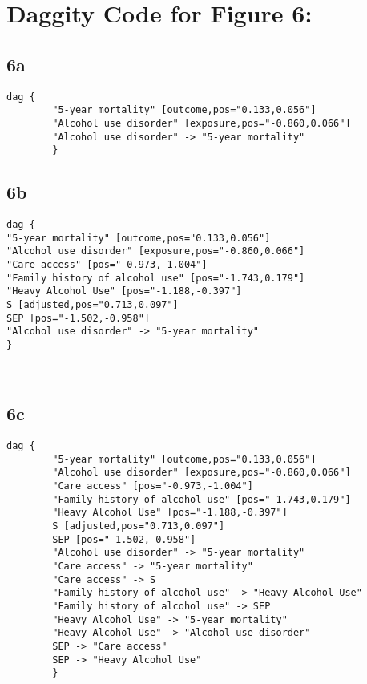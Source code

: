 \documentclass{article}
\begin{document}
\section*{Daggity Code for Figure 6:}
\subsection*{6a}
\begin{lstlisting}[frame=single, basicstyle=\ttfamily, linewidth=20.5cm]
    dag {
        "5-year mortality" [outcome,pos="0.133,0.056"]
        "Alcohol use disorder" [exposure,pos="-0.860,0.066"]
        "Alcohol use disorder" -> "5-year mortality"
        }        
\end{lstlisting}

\subsection*{6b}
\begin{lstlisting}[frame=single, basicstyle=\ttfamily, linewidth=20.5cm]
    dag {
"5-year mortality" [outcome,pos="0.133,0.056"]
"Alcohol use disorder" [exposure,pos="-0.860,0.066"]
"Care access" [pos="-0.973,-1.004"]
"Family history of alcohol use" [pos="-1.743,0.179"]
"Heavy Alcohol Use" [pos="-1.188,-0.397"]
S [adjusted,pos="0.713,0.097"]
SEP [pos="-1.502,-0.958"]
"Alcohol use disorder" -> "5-year mortality"
}

        
\end{lstlisting}

\subsection*{6c}
\begin{lstlisting}[frame=single, basicstyle=\ttfamily, linewidth=20.5cm]
    dag {
        "5-year mortality" [outcome,pos="0.133,0.056"]
        "Alcohol use disorder" [exposure,pos="-0.860,0.066"]
        "Care access" [pos="-0.973,-1.004"]
        "Family history of alcohol use" [pos="-1.743,0.179"]
        "Heavy Alcohol Use" [pos="-1.188,-0.397"]
        S [adjusted,pos="0.713,0.097"]
        SEP [pos="-1.502,-0.958"]
        "Alcohol use disorder" -> "5-year mortality"
        "Care access" -> "5-year mortality"
        "Care access" -> S
        "Family history of alcohol use" -> "Heavy Alcohol Use"
        "Family history of alcohol use" -> SEP
        "Heavy Alcohol Use" -> "5-year mortality"
        "Heavy Alcohol Use" -> "Alcohol use disorder"
        SEP -> "Care access"
        SEP -> "Heavy Alcohol Use"
        }
        
\end{lstlisting}
\end{document}
